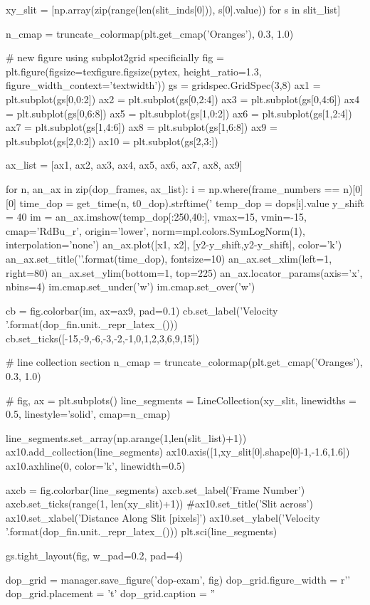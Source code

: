\documentclass{emulateapj}
\begin{document}
\begin{pycode}[DOPPLER]
xy_slit = [np.array(zip(range(len(slit_inds[0])), s[0].value)) for s in slit_list]


n_cmap = truncate_colormap(plt.get_cmap('Oranges'), 0.3, 1.0)


# new figure using subplot2grid specificially
fig = plt.figure(figsize=texfigure.figsize(pytex, height_ratio=1.3, figure_width_context='textwidth'))
gs = gridspec.GridSpec(3,8)
ax1 = plt.subplot(gs[0,0:2])
ax2 = plt.subplot(gs[0,2:4])
ax3 = plt.subplot(gs[0,4:6])
ax4 = plt.subplot(gs[0,6:8])
ax5 = plt.subplot(gs[1,0:2])
ax6 = plt.subplot(gs[1,2:4])
ax7 = plt.subplot(gs[1,4:6])
ax8 = plt.subplot(gs[1,6:8])
ax9 = plt.subplot(gs[2,0:2])
ax10 = plt.subplot(gs[2,3:])
 
ax_list = [ax1, ax2, ax3, ax4, ax5,
           ax6, ax7, ax8, ax9]

for n, an_ax in zip(dop_frames, ax_list):
    i = np.where(frame_numbers == n)[0][0]
    time_dop = get_time(n, t0_dop).strftime('%
    temp_dop = dops[i].value
    y_shift = 40
    im = an_ax.imshow(temp_dop[:250,40:], vmax=15, vmin=-15,
                      cmap='RdBu_r', origin='lower',
                      norm=mpl.colors.SymLogNorm(1),
                      interpolation='none')
    an_ax.plot([x1, x2], [y2-y_shift,y2-y_shift], color='k')
    an_ax.set_title('{}'.format(time_dop), fontsize=10)
    an_ax.set_xlim(left=1, right=80)
    an_ax.set_ylim(bottom=1, top=225)
    an_ax.locator_params(axis='x', nbins=4)
    im.cmap.set_under('w')
    im.cmap.set_over('w')

cb = fig.colorbar(im, ax=ax9, pad=0.1)
cb.set_label('Velocity {}'.format(dop_fin.unit._repr_latex_()))
cb.set_ticks([-15,-9,-6,-3,-2,-1,0,1,2,3,6,9,15])

# line collection section
n_cmap = truncate_colormap(plt.get_cmap('Oranges'), 0.3, 1.0)

# fig, ax = plt.subplots()
line_segments = LineCollection(xy_slit,
                               linewidths = 0.5,
                               linestyle='solid',
                               cmap=n_cmap)

line_segments.set_array(np.arange(1,len(slit_list)+1))
ax10.add_collection(line_segments)
ax10.axis([1,xy_slit[0].shape[0]-1,-1.6,1.6])
ax10.axhline(0, color='k', linewidth=0.5)

axcb = fig.colorbar(line_segments)
axcb.set_label('Frame Number')
axcb.set_ticks(range(1, len(xy_slit)+1))
#ax10.set_title('Slit across')
ax10.set_xlabel('Distance Along Slit [pixels]')
ax10.set_ylabel('Velocity {}'.format(dop_fin.unit._repr_latex_()))
plt.sci(line_segments)

gs.tight_layout(fig, w_pad=0.2, pad=4)

dop_grid = manager.save_figure('dop-exam', fig)
dop_grid.figure_width = r'\textwidth'
dop_grid.placement = 't'
dop_grid.caption = ''


\end{pycode}
\end{document}
